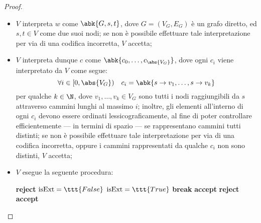 \documentclass[a4paper, 12pt]{report}
\begin{document}
\begin{proof}
        \begin{itemize}
            \item $V$ interpreta $w$ come $\abk{G, s, t}$, dove $G = (V_G, E_G)$ è un grafo diretto, ed $s, t \in V$ come due suoi nodi; se non è possibile effettuare tale interpretazione per via di una codifica incorretta, $V$ accetta;
            \item $V$ interpreta dunque $c$ come $\abk{c_0, \ldots, c_{\abs{V_G}}}$, dove ogni $c_i$ viene interpretato da $V$ come segue: $$\forall i \in [0, \abs{V_G}) \quad c_i = \abk{s \to v_1, \ldots, s \to v_k}$$ per qualche $k\in \N$, dove $v_1, \ldots, v_k \in V_G$ sono tutti i nodi raggiungibili da $s$ attraverso cammini lunghi al massimo $i$; inoltre, gli elementi all'interno di ogni $c_i$ devono essere ordinati lessicograficamente, al fine di poter controllare efficientemente --- in termini di spazio --- se rappresentano cammini tutti distinti; se non è possibile effettuare tale interpretazione per via di una codifica incorretta, oppure i cammini rappresentati da qualche $c_i$ non sono distinti, $V$ accetta;
            \item $V$ esegue la seguente procedura:
                \begin{algorithmic}[1]
                         
                                \State \textbf{reject}
                            \EndIf
                        \EndFor
                        \For{$i \in [0, \abs{V_G})$}
                                \State $\textrm{isExt} = \ttt{False}$
                                        \State $\textrm{isExt} = \ttt{True}$
                                        \State \textbf{break}
                                    \EndIf
                                \EndFor
                                    \State \textbf{accept}
                                \EndIf
                            \EndFor
                                \State \textbf{reject}
                            \EndIf
                        \EndFor
                        \State \textbf{accept}
                    \EndFunction
                \end{algorithmic}
        \end{itemize}


\end{proof}
\end{document}
